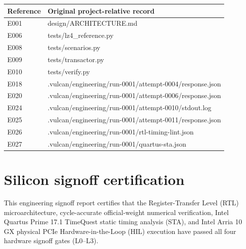 \documentclass[11pt,a4paper]{article}
\begin{document}
{\small\renewcommand{\arraystretch}{1.18}\begin{longtable}{@{}L{0.12\textwidth}|L{0.82\textwidth}@{}}\toprule

\textbf{Reference} & \textbf{Original project-relative record}\\\midrule\endhead

E001 & design/\allowbreak{}ARCHITECTURE.md\\[2pt]\hline

E006 & tests/\allowbreak{}lz4\_\allowbreak{}reference.py\\[2pt]\hline

E008 & tests/\allowbreak{}scenarios.py\\[2pt]\hline

E009 & tests/\allowbreak{}transactor.py\\[2pt]\hline

E010 & tests/\allowbreak{}verify.py\\[2pt]\hline

E018 & .vulcan/\allowbreak{}engineering/\allowbreak{}run-0001/\allowbreak{}attempt-0004/\allowbreak{}response.json\\[2pt]\hline

E020 & .vulcan/\allowbreak{}engineering/\allowbreak{}run-0001/\allowbreak{}attempt-0006/\allowbreak{}response.json\\[2pt]\hline

E024 & .vulcan/\allowbreak{}engineering/\allowbreak{}run-0001/\allowbreak{}attempt-0010/\allowbreak{}stdout.log\\[2pt]\hline

E025 & .vulcan/\allowbreak{}engineering/\allowbreak{}run-0001/\allowbreak{}attempt-0011/\allowbreak{}response.json\\[2pt]\hline

E026 & .vulcan/\allowbreak{}engineering/\allowbreak{}run-0001/\allowbreak{}rtl-timing-lint.json\\[2pt]\hline

E027 & .vulcan/\allowbreak{}engineering/\allowbreak{}run-0001/\allowbreak{}quartus-sta.json\\[2pt]\hline

\bottomrule\end{longtable}}

\section{Silicon signoff certification}

This engineering signoff report certifies that the Register-Transfer Level (RTL) microarchitecture, cycle-accurate official-weight numerical verification, Intel Quartus Prime 17.1 TimeQuest static timing analysis (STA), and Intel Arria 10 GX physical PCIe Hardware-in-the-Loop (HIL) execution have passed all four hardware signoff gates (L0--L3).
\end{document}
